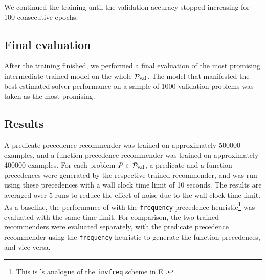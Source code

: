 We continued the training until the validation accuracy stopped increasing for 100 consecutive epochs.

\subsection{Final evaluation}

After the training finished,
we performed a final evaluation of the most promising intermediate trained model on the whole $\operatorname{\mathcal{P}_{\mathrm{val}}}$.
The model that manifested the best estimated solver performance on a sample of \num{1000} validation problems
was taken as the most promising.

\subsection{Results}

A predicate precedence recommender was trained on approximately \num{500000} examples,
and a function precedence recommender was trained on approximately \num{400000} examples.
For each problem $P \in \operatorname{\mathcal{P}_{\mathrm{val}}}$,
a predicate and a function precedences
were generated by the respective trained recommender,
and \Vampire{} was run using these precedences
with a wall clock time limit of 10 seconds.
The results are averaged over 5 runs to reduce the effect of noise due to the wall clock time limit.
As a baseline, the performance of \Vampire{} with the \texttt{frequency} precedence heuristic\footnote{
This is \Vampire{}'s analogue of the \texttt{invfreq} scheme in E \cite{E-manual}.}
was evaluated with the same time limit.
For comparison, the two trained recommenders were evaluated separately,
with the predicate precedence recommender using the \texttt{frequency} heuristic to generate the function precedences, and vice versa.

